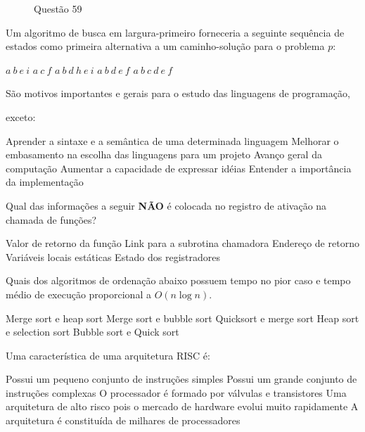 \documentclass[12pt, addpoints]{exam}
\begin{document}
\begin{questions}
\begin{figure}[H]
    \caption{Questão 59}

    \label{fig:enter-label}

\end{figure}



Um algoritmo de busca em largura-primeiro forneceria a seguinte sequência de estados como primeira alternativa a um caminho-solução para o problema \( p \):
\begin{choices}
\choice \( a \ b \ e \ i \)
\choice \( a \ c \ f \)
\choice \( a \ b \ d \ h \ e \ i \)
\choice \( a \ b \ d \ e \ f \)
\choice \( a \ b \ c \ d \ e \ f \)
\end{choices}

\question

São motivos importantes e gerais para o estudo das linguagens de programação,

exceto:
\begin{choices}
\choice Aprender a sintaxe e a semântica de uma determinada linguagem
\choice Melhorar o embasamento na escolha das linguagens para um projeto
\choice Avanço geral da computação
\choice Aumentar a capacidade de expressar idéias
\choice Entender a importância da implementação
\end{choices}

\question

Qual das informações a seguir \textbf{NÃO} é colocada no registro de ativação na chamada de funções?


\begin{choices}
\choice Valor de retorno da função
\choice Link para a subrotina chamadora
\choice Endereço de retorno
\choice Variáveis locais estáticas
\choice Estado dos registradores
\end{choices}

\question

Quais dos algoritmos de ordenação abaixo possuem tempo no pior caso e tempo médio de execução proporcional a \( O(n \log n) \).
\begin{choices}
\choice Merge sort e heap sort
\choice Merge sort e bubble sort
\choice Quicksort e merge sort
\choice Heap sort e selection sort
\choice Bubble sort e Quick sort
\end{choices}

\question

Uma característica de uma arquitetura RISC é:
\begin{choices}
\choice Possui um pequeno conjunto de instruções simples
\choice Possui um grande conjunto de instruções complexas
\choice O processador é formado por válvulas e transistores
\choice Uma arquitetura de alto risco pois o mercado de hardware evolui muito rapidamente
\choice A arquitetura é constituída de milhares de processadores
\end{choices}


\end{questions}
\end{document}
